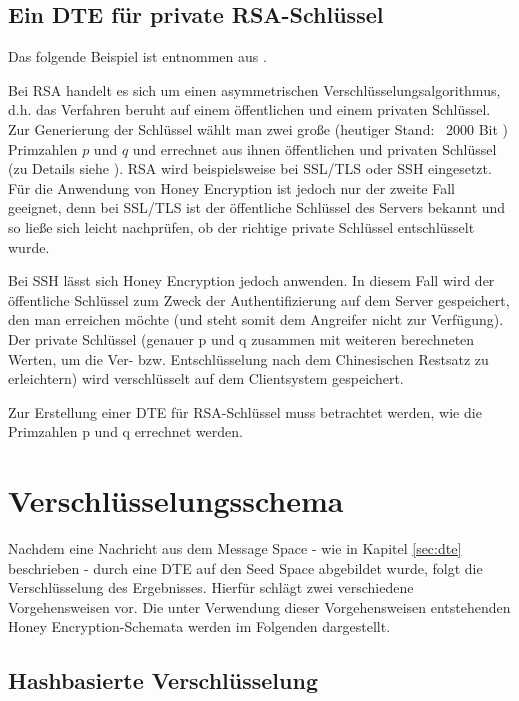 \subsection{Ein DTE für private RSA-Schlüssel}

Das folgende Beispiel ist entnommen aus \cite{EURO2014}.

Bei RSA handelt es sich um einen asymmetrischen Verschlüsselungsalgorithmus, d.h. das Verfahren beruht auf einem öffentlichen und einem privaten Schlüssel. Zur Generierung der Schlüssel wählt man zwei große (heutiger Stand: ~2000 Bit \cite{BSI2014}) Primzahlen \(p\) und \(q\) und errechnet aus ihnen öffentlichen und privaten Schlüssel (zu Details siehe \cite{Schneier2006}). RSA wird beispielsweise bei SSL/TLS oder SSH eingesetzt. Für die Anwendung von Honey Encryption ist jedoch nur der zweite Fall geeignet, denn bei SSL/TLS ist der öffentliche Schlüssel des Servers bekannt und so ließe sich leicht nachprüfen, ob der richtige private Schlüssel entschlüsselt wurde. 

Bei SSH lässt sich Honey Encryption jedoch anwenden. In diesem Fall wird der öffentliche Schlüssel zum Zweck der Authentifizierung auf dem Server gespeichert, den man erreichen möchte (und steht somit dem Angreifer nicht zur Verfügung). Der private Schlüssel (genauer p und q zusammen mit weiteren berechneten Werten, um die Ver- bzw. Entschlüsselung nach dem Chinesischen Restsatz zu erleichtern) wird verschlüsselt auf dem Clientsystem gespeichert. 

Zur Erstellung einer DTE für RSA-Schlüssel muss betrachtet werden, wie die Primzahlen p und q errechnet werden. 

\section{Verschlüsselungsschema}
\label{sec:schema}

Nachdem eine Nachricht aus dem Message Space - wie in Kapitel \ref{sec:dte} beschrieben - durch eine DTE auf den Seed Space abgebildet wurde, folgt die Verschlüsselung des Ergebnisses. Hierfür schlägt \cite{EURO2014} zwei verschiedene Vorgehensweisen vor. Die unter Verwendung dieser Vorgehensweisen entstehenden Honey Encryption-Schemata werden im Folgenden dargestellt.

\subsection{Hashbasierte Verschlüsselung}

